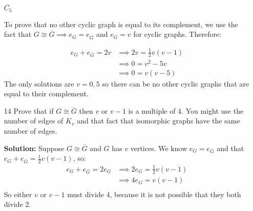 \documentclass{article}
\begin{document}
\begin{enumerate}

$\overline{C_5}$


To prove that no other cyclic graph is equal to its complement, we use the fact that $G \cong \overline{G} \implies e_G = e_{\overline{G}}$ and $e_G = v$ for cyclic graphs. Therefore:

\begin{align}
e_G + e_{\overline{G}} = 2v &\implies 2v = \frac{1}{2}v(v - 1) \\
	&\implies 0 = v^2 - 5v \\
	&\implies 0 = v(v - 5)
\end{align}
The only solutions are $v = 0, 5$ so there can be no other cyclic graphs that are equal to their complement.

\item[14] Prove that if $G \cong \overline{G}$ then $v$ or $v - 1$ is a multiple of 4. You might use the number of edges of $K_v$ and that fact that isomorphic graphs have the same number of edges.

\textbf{Solution:} Suppose $G \cong \overline{G}$ and $G$ has $v$ vertices. We know $e_G = e_{\overline{G}}$ and that $e_G + e_{\overline{G}} = \frac{1}{2}v(v - 1)$, so:
\begin{align}
e_G + e_{\overline{G}} = 2e_G &\implies 2e_G = \frac{1}{2}v(v - 1) \\
	&\implies 4e_G = v(v - 1)\\
\end{align}
So either $v$ or $v - 1$ must divide 4, because it is not possible that they both divide 2.


\end{enumerate}
\end{document}
